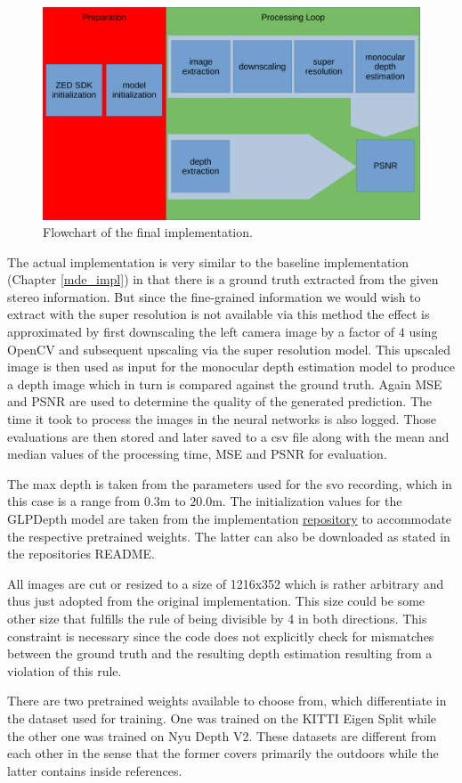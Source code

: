 \begin{figure}[ht!]
    \begin{center}
        \includegraphics[scale=.5]{resources/general_plan.pdf}
        \caption{Flowchart of the final implementation.} \label{flowchart_general}
    \end{center}
\end{figure}

The actual implementation is very similar to the baseline implementation (Chapter \ref*{mde_impl}) in that there is a ground truth extracted from the given stereo information. But since the fine-grained information we would wish to extract with the super resolution is not available via this method the effect is approximated by first downscaling the left camera image by a factor of $4$ using OpenCV and subsequent upscaling via the super resolution model. This upscaled image is then used as input for the monocular depth estimation model to produce a depth image which in turn is compared against the ground truth. Again MSE and PSNR are used to determine the quality of the generated prediction. The time it took to process the images in the neural networks is also logged. Those evaluations are then stored and later saved to a csv file along with the mean and median values of the processing time, MSE and PSNR for evaluation.

The max depth is taken from the parameters used for the svo recording, which in this case is a range from $0.3\mathrm{m}$ to $20.0\mathrm{m}$. The initialization values for the GLPDepth model are taken from the implementation \href{https://github.com/vinvino02/GLPDepth}{repository} to accommodate the respective pretrained weights. The latter can also be downloaded as stated in the repositories README.

All images are cut or resized to a size of 1216x352 which is rather arbitrary and thus just adopted from the original implementation. This size could be some other size that fulfills the rule of being divisible by 4 in both directions. This constraint is necessary since the code does not explicitly check for mismatches between the ground truth and the resulting depth estimation resulting from a violation of this rule.

There are two pretrained weights available to choose from, which differentiate in the dataset used for training. One was trained on the KITTI Eigen Split while the other one was trained on Nyu Depth V2. These datasets are different from each other in the sense that the former covers primarily the outdoors while the latter contains inside references.
